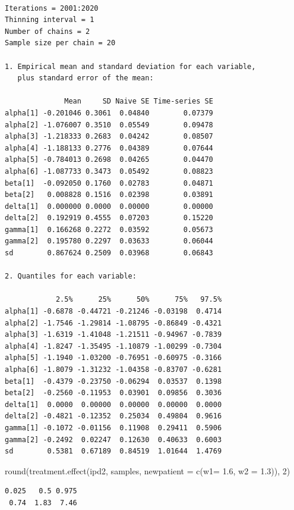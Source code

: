 \documentclass[
  letterpaper,
  DIV=11,
  numbers=noendperiod]{scrreprt}
\newenvironment{Shaded}{\begin{snugshade}}{\end{snugshade}}
\newcommand{\AttributeTok}[1]{\textcolor[rgb]{0.40,0.45,0.13}{#1}}
\newcommand{\DecValTok}[1]{\textcolor[rgb]{0.68,0.00,0.00}{#1}}
\newcommand{\FloatTok}[1]{\textcolor[rgb]{0.68,0.00,0.00}{#1}}
\newcommand{\FunctionTok}[1]{\textcolor[rgb]{0.28,0.35,0.67}{#1}}
\newcommand{\NormalTok}[1]{\textcolor[rgb]{0.00,0.23,0.31}{#1}}
\begin{document}
\begin{verbatim}

Iterations = 2001:2020
Thinning interval = 1 
Number of chains = 2 
Sample size per chain = 20 

1. Empirical mean and standard deviation for each variable,
   plus standard error of the mean:

              Mean     SD Naive SE Time-series SE
alpha[1] -0.201046 0.3061  0.04840        0.07379
alpha[2] -1.076007 0.3510  0.05549        0.09478
alpha[3] -1.218333 0.2683  0.04242        0.08507
alpha[4] -1.188133 0.2776  0.04389        0.07644
alpha[5] -0.784013 0.2698  0.04265        0.04470
alpha[6] -1.087733 0.3473  0.05492        0.08823
beta[1]  -0.092050 0.1760  0.02783        0.04871
beta[2]   0.008828 0.1516  0.02398        0.03891
delta[1]  0.000000 0.0000  0.00000        0.00000
delta[2]  0.192919 0.4555  0.07203        0.15220
gamma[1]  0.166268 0.2272  0.03592        0.05673
gamma[2]  0.195780 0.2297  0.03633        0.06044
sd        0.867624 0.2509  0.03968        0.06843

2. Quantiles for each variable:

            2.5%      25%      50%      75%   97.5%
alpha[1] -0.6878 -0.44721 -0.21246 -0.03198  0.4714
alpha[2] -1.7546 -1.29814 -1.08795 -0.86849 -0.4321
alpha[3] -1.6319 -1.41048 -1.21511 -0.94967 -0.7839
alpha[4] -1.8247 -1.35495 -1.10879 -1.00299 -0.7304
alpha[5] -1.1940 -1.03200 -0.76951 -0.60975 -0.3166
alpha[6] -1.8079 -1.31232 -1.04358 -0.83707 -0.6281
beta[1]  -0.4379 -0.23750 -0.06294  0.03537  0.1398
beta[2]  -0.2560 -0.11953  0.03901  0.09856  0.3036
delta[1]  0.0000  0.00000  0.00000  0.00000  0.0000
delta[2] -0.4821 -0.12352  0.25034  0.49804  0.9616
gamma[1] -0.1072 -0.01156  0.11908  0.29411  0.5906
gamma[2] -0.2492  0.02247  0.12630  0.40633  0.6003
sd        0.5381  0.67189  0.84519  1.01644  1.4769
\end{verbatim}

\begin{Shaded}
\begin{Highlighting}[]
\FunctionTok{round}\NormalTok{(}\FunctionTok{treatment.effect}\NormalTok{(ipd2, samples, }\AttributeTok{newpatient =} \FunctionTok{c}\NormalTok{(}\AttributeTok{w1=} \FloatTok{1.6}\NormalTok{, }\AttributeTok{w2 =} \FloatTok{1.3}\NormalTok{)), }\DecValTok{2}\NormalTok{)}
\end{Highlighting}
\end{Shaded}

\begin{verbatim}
0.025   0.5 0.975 
 0.74  1.83  7.46 
\end{verbatim}
\end{document}
